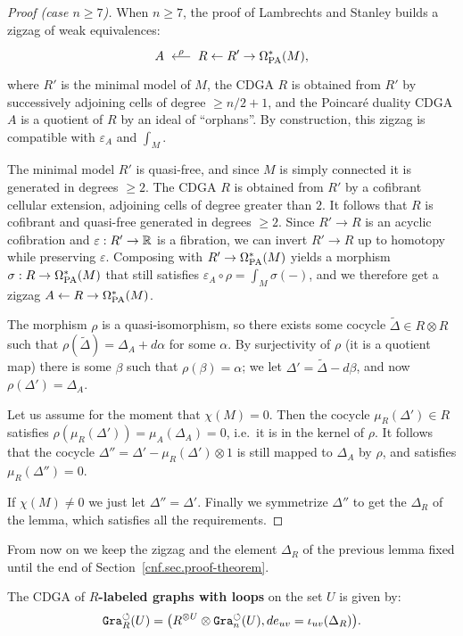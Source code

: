 \begin{proof}[Proof (case $n \geq 7$)]
  When $n \geq 7$, the proof of Lambrechts and Stanley builds a zigzag of weak equivalences:
  \[ A \tkleftarrow{\rho} R \gets R' \to \OmPA^{*}(M), \]
  where $R'$ is the minimal model of $M$, the CDGA $R$ is obtained from $R'$ by successively adjoining cells of degree $\geq n/2+1$, and the Poincaré duality CDGA $A$ is a quotient of $R$ by an ideal of ``orphans''.
  By construction, this zigzag is compatible with $\varepsilon_{A}$ and $\int_{M}$.

  The minimal model $R'$ is quasi-free, and since $M$ is simply connected it is generated in degrees $\geq 2$.
  The CDGA $R$ is obtained from $R'$ by a cofibrant cellular extension, adjoining cells of degree greater than $2$.
  It follows that $R$ is cofibrant and quasi-free generated in degrees $\geq 2$.
  Since $R' \to R$ is an acyclic cofibration and $\varepsilon : R' \to \mathbb{R}$ is a fibration, we can invert $R' \to R$ up to homotopy while preserving $\varepsilon$.
  Composing with $R' \to \Omega_{\mathrm{PA}}^{*}(M)$ yields a morphism $\sigma : R \to \Omega_{\mathrm{PA}}^{*}(M)$ that still satisfies $\varepsilon_{A} \circ \rho = \int_{M} \sigma(-)$, and we therefore get a zigzag $A \gets R \to \Omega_{\mathrm{PA}}^{*}(M)$.

  The morphism $\rho$ is a quasi-isomorphism, so there exists some cocycle $\tilde\Delta \in R \otimes R$ such that $\rho(\tilde\Delta) = \Delta_{A} + d\alpha$ for some $\alpha$.
  By surjectivity of $\rho$ (it is a quotient map) there is some $\beta$ such that $\rho(\beta) = \alpha$; we let $\Delta' = \tilde\Delta - d\beta$, and now $\rho(\Delta') = \Delta_{A}$.

  Let us assume for the moment that $\chi(M) = 0$.
  Then the cocycle $\mu_{R}(\Delta') \in R$ satisfies $\rho(\mu_{R}(\Delta')) = \mu_{A}(\Delta_{A}) = 0$, i.e.\ it is in the kernel of $\rho$.
  It follows that the cocycle $\Delta'' = \Delta' - \mu_{R}(\Delta') \otimes 1$ is still mapped to $\Delta_{A}$ by $\rho$, and satisfies $\mu_{R}(\Delta'') = 0$.

  If $\chi(M) \neq 0$ we just let $\Delta'' = \Delta'$.
  Finally we symmetrize $\Delta''$ to get the $\Delta_{R}$ of the lemma, which satisfies all the requirements.
\end{proof}

From now on we keep the zigzag and the element $\Delta_{R}$ of the previous lemma fixed until the end of Section~\ref{cnf.sec.proof-theorem}.

\begin{definition}
  \label{cnf.def.gra-r}
  The CDGA of \textbf{$R$-labeled graphs with loops} on the set $U$ is given by:
  \[ \mathtt{Gra}^{\circlearrowleft}_{R}(U) = \bigl( R^{\otimes U} \otimes \mathtt{Gra}^{\circlearrowleft}_{n}(U), d e_{uv} = \iota_{uv}(\Delta_{R}) \bigr). \]
\end{definition}

